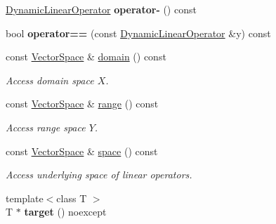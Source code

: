 \begin{DoxyCompactItemize}
\item 
\hypertarget{classSpacy_1_1DynamicLinearOperator_afd842124db19f3bb9716ca4bb12a4867}{\hyperlink{classSpacy_1_1DynamicLinearOperator}{\-Dynamic\-Linear\-Operator} {\bfseries operator-\/} () const }\label{classSpacy_1_1DynamicLinearOperator_afd842124db19f3bb9716ca4bb12a4867}

\item 
\hypertarget{classSpacy_1_1DynamicLinearOperator_a8f252aa5f13f636533d6f4337c4116d0}{bool {\bfseries operator==} (const \hyperlink{classSpacy_1_1DynamicLinearOperator}{\-Dynamic\-Linear\-Operator} \&y) const }\label{classSpacy_1_1DynamicLinearOperator_a8f252aa5f13f636533d6f4337c4116d0}

\item 
\hypertarget{classSpacy_1_1DynamicLinearOperator_aa5882565e1a88f20a16f7e7a27df3015}{const \hyperlink{classSpacy_1_1VectorSpace}{\-Vector\-Space} \& \hyperlink{classSpacy_1_1DynamicLinearOperator_aa5882565e1a88f20a16f7e7a27df3015}{domain} () const }\label{classSpacy_1_1DynamicLinearOperator_aa5882565e1a88f20a16f7e7a27df3015}

\begin{DoxyCompactList}\small\item\em \-Access domain space $X$. \end{DoxyCompactList}\item 
\hypertarget{classSpacy_1_1DynamicLinearOperator_a08e5f8bd41f1112ae349e50dd773b9ea}{const \hyperlink{classSpacy_1_1VectorSpace}{\-Vector\-Space} \& \hyperlink{classSpacy_1_1DynamicLinearOperator_a08e5f8bd41f1112ae349e50dd773b9ea}{range} () const }\label{classSpacy_1_1DynamicLinearOperator_a08e5f8bd41f1112ae349e50dd773b9ea}

\begin{DoxyCompactList}\small\item\em \-Access range space $Y$. \end{DoxyCompactList}\item 
\hypertarget{classSpacy_1_1DynamicLinearOperator_afde64039ceab0ad8752bce3ac2187a41}{const \hyperlink{classSpacy_1_1VectorSpace}{\-Vector\-Space} \& \hyperlink{classSpacy_1_1DynamicLinearOperator_afde64039ceab0ad8752bce3ac2187a41}{space} () const }\label{classSpacy_1_1DynamicLinearOperator_afde64039ceab0ad8752bce3ac2187a41}

\begin{DoxyCompactList}\small\item\em \-Access underlying space of linear operators. \end{DoxyCompactList}\item 
\hypertarget{classSpacy_1_1DynamicLinearOperator_a5574c61e31ef28d9d1660dd69fc31810}{{\footnotesize template$<$class T $>$ }\\\-T $\ast$ {\bfseries target} () noexcept}\label{classSpacy_1_1DynamicLinearOperator_a5574c61e31ef28d9d1660dd69fc31810}


\end{DoxyCompactItemize}
